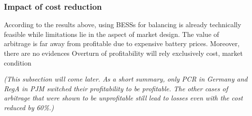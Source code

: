 \subsubsection{Impact of cost reduction}
According to the results above, using BESSs for balancing is already technically feasible while limitations lie in the aspect of market design. The value of arbitrage is far away from profitable due to expensive battery prices. Moreover, there are no evidences 
Overturn of profitability will rely exclusively cost, market condition

\textit{(This subsection will come later. As a short summary, only PCR in Germany and RegA in PJM switched their profitability to be profitable. The other cases of arbitrage that were shown to be unprofitable still lead to losses even with the cost reduced by 60\%.)}


